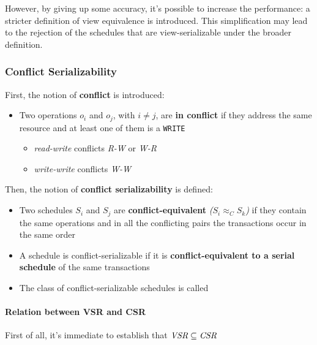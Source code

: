 \documentclass[english]{article}
\begin{document}
However, by giving up some accuracy, it's possible to increase the performance: a stricter definition of view equivalence is introduced.
This simplification may lead to the rejection of the schedules that are view-serializable under the broader definition.

\subsubsection{Conflict Serializability}

First, the notion of \textbf{conflict} is introduced:

\begin{itemize}
  \item Two operations \(o_i\) and \(o_j\), with \(i \neq j\), are \textbf{in conflict} if they address the same resource and at least one of them is a \texttt{WRITE}
        \begin{itemize}
          \item \textit{read-write} conflicts \textit{R-W} or \textit{W-R}
          \item \textit{write-write} conflicts \textit{W-W}
        \end{itemize}
\end{itemize}

Then, the notion of \textbf{conflict serializability} is defined:

\begin{itemize}
  \item Two schedules \(S_i\) and \(S_j\) are \textbf{conflict-equivalent} \textit{(\(S_i \approx_C S_k\))} if they contain the same operations and in all the conflicting pairs the transactions occur in the same order
  \item A schedule is conflict-serializable if it is \textbf{conflict-equivalent to a serial schedule} of the same transactions
  \item The class of conflict-serializable schedules is called \csr
\end{itemize}

\paragraph{Relation between VSR and CSR}

First of all, it's immediate to establish that \(\textit{VSR} \subseteq \textit{CSR}\)
\end{document}
